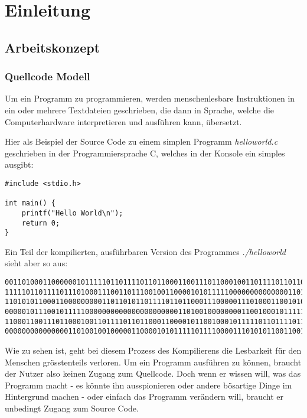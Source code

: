 \documentclass[a4paper,11pt]{article}
\begin{document}
\newpage

\section{Einleitung}

\subsection{Arbeitskonzept}

\subsubsection{Quellcode Modell}
Um ein Programm zu programmieren, werden menschenlesbare Instruktionen in ein oder mehrere Textdateien geschrieben,
die dann in Sprache, welche die Computerhardware interpretieren und ausführen kann, übersetzt.


Hier als Beispiel der Source Code zu einem simplen Programm \textit{helloworld.c} geschrieben in der Programmiersprache C, welches in der Konsole ein simples  ausgibt:

\lstset{language=C}
\begin{lstlisting}
#include <stdio.h>

int main() {
    printf("Hello World\n");
    return 0;
}
\end{lstlisting}
Ein Teil der kompilierten, ausführbaren Version des Programmes \textit{./helloworld} sieht aber so aus:
\begin{lstlisting}
0011010001100000010111110110111101101100011001110110001001101111011011000110000101100100
1111101101111011101000111001101110010011000010101111100000000000000110100011100000111100
1101010110001100000000011011010110111101101100011100000111010001100101011001000110010100
0000010111001011111000000000000000000000011010010000000011001000101111101011111011011110
1100011001110110001001101111011011000110000101100100010111110110111101110100011100110111
0000000000000001101001001000001100001010111110111100001110101011001100101111101101110011
\end{lstlisting}

Wie zu sehen ist, geht bei diesem Prozess des Kompilierens die Lesbarkeit für den Menschen grösstenteils verloren. Um ein Programm ausführen zu können, braucht der Nutzer also keinen Zugang zum Quellcode. Doch wenn er wissen will, was das Programm macht - es könnte ihn ausspionieren oder andere bösartige Dinge im Hintergrund machen - oder einfach das Programm verändern will, braucht er unbedingt Zugang zum Source Code.\\
\end{document}

